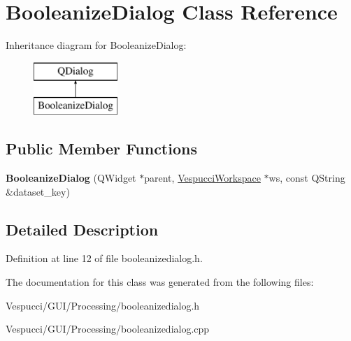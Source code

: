 \hypertarget{class_booleanize_dialog}{}\section{Booleanize\+Dialog Class Reference}
\label{class_booleanize_dialog}
Inheritance diagram for Booleanize\+Dialog\+:\begin{figure}[H]
\begin{center}
\leavevmode
\includegraphics[height=2.000000cm]{class_booleanize_dialog}
\end{center}
\end{figure}
\subsection*{Public Member Functions}
\begin{DoxyCompactItemize}
\item 
{\bfseries Booleanize\+Dialog} (Q\+Widget $\ast$parent, \hyperlink{class_vespucci_workspace}{Vespucci\+Workspace} $\ast$ws, const Q\+String \&dataset\+\_\+key)\hypertarget{class_booleanize_dialog_a4af0a944dcb44ee56b78680e7e01a702}{}\label{class_booleanize_dialog_a4af0a944dcb44ee56b78680e7e01a702}

\end{DoxyCompactItemize}


\subsection{Detailed Description}


Definition at line 12 of file booleanizedialog.\+h.



The documentation for this class was generated from the following files\+:\begin{DoxyCompactItemize}
\item 
Vespucci/\+G\+U\+I/\+Processing/booleanizedialog.\+h\item 
Vespucci/\+G\+U\+I/\+Processing/booleanizedialog.\+cpp\end{DoxyCompactItemize}
